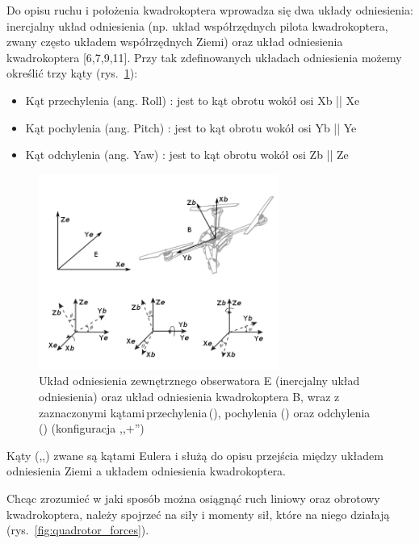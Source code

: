 Do opisu ruchu i położenia kwadrokoptera wprowadza się dwa układy odniesienia: inercjalny układ odniesienia (np. układ współrzędnych pilota kwadrokoptera, zwany często układem współrzędnych Ziemi) oraz układ odniesienia kwadrokoptera [6,7,9,11]. Przy tak zdefinowanych układach odniesienia możemy określić trzy kąty (rys.~\ref{fig:quadrotor_frames.png}):

\begin{itemize}
	\item Kąt przechylenia (ang. Roll) \straightphi: jest to kąt obrotu wokół osi Xb || Xe
	\item Kąt pochylenia (ang. Pitch) \straighttheta: jest to kąt obrotu wokół osi Yb || Ye 
	\item Kąt odchylenia (ang. Yaw) \textpsi: jest to kąt obrotu wokół osi Zb || Ze
\end{itemize}

\begin{figure}[!htb]
	\centering
		\includegraphics[width=0.7\textwidth]{Pictures/quadrotor_frames.png}
		\caption[Układy odniesienia]{Układ odniesienia zewnętrznego obserwatora E (inercjalny układ odniesienia) oraz układ odniesienia kwadrokoptera B, wraz z zaznaczonymi kątami\,przechylenia\,(\straightphi), pochylenia (\straighttheta) oraz odchylenia (\textpsi) (konfiguracja ,,+'')}
	\label{fig:quadrotor_frames.png}
\end{figure}

Kąty (\straightphi,\straighttheta,\textpsi) zwane są kątami Eulera i służą do opisu przejścia między układem odniesienia Ziemi a układem odniesienia kwadrokoptera.

Chcąc zrozumieć w jaki sposób można osiągnąć ruch liniowy oraz obrotowy kwadrokoptera, należy spojrzeć na siły i momenty sił, które na niego działają (rys.~\ref{fig:quadrotor_forces}). 

